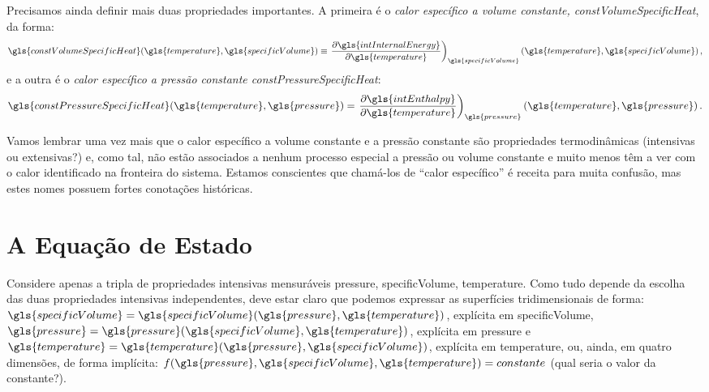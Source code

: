     Precisamos ainda definir mais duas propriedades importantes. A primeira é o
    \emph{calor específico a volume constante, \gls{constVolumeSpecificHeat}},
    da forma:
    \begin{equation} \label{eq:5.21}
        \gls{constVolumeSpecificHeat}
        \functionOf{
            \gls{temperature},
            \gls{specificVolume}
        }
        \equiv
        \ddxconsty{
            \gls{intInternalEnergy}
        }{
            \gls{temperature}
        }{
            \gls{specificVolume}
        }
        \functionOf{
            \gls{temperature},
            \gls{specificVolume}
        }\,,
    \end{equation}
    e a outra é o \emph{calor específico a pressão constante
    \gls{constPressureSpecificHeat}}:
    \begin{equation} \label{eq:5.22}
        \gls{constPressureSpecificHeat}
        \functionOf{
            \gls{temperature},
            \gls{pressure}
        }
        =
        \ddxconsty{
            \gls{intEnthalpy}
        }{
            \gls{temperature}
        }{
            \gls{pressure}
        }
        \functionOf{
            \gls{temperature},
            \gls{pressure}
        }\,.
    \end{equation}

    Vamos lembrar uma vez mais que o calor específico a volume constante e a
    pressão constante são propriedades termodinâmicas (intensivas ou
    extensivas?) e, como tal, não estão associados a nenhum processo especial a
    pressão ou volume constante e muito menos têm a ver com o calor
    identificado na fronteira do sistema. Estamos conscientes que chamá-los de
    \enquote{calor específico} é receita para muita confusão, mas estes nomes
    possuem fortes conotações históricas.


    \section{A Equação de Estado}

    Considere apenas a tripla de propriedades intensivas mensuráveis
    \gls{pressure}, \gls{specificVolume}, \gls{temperature}.  Como tudo depende
    da escolha das duas propriedades intensivas independentes, deve estar claro
    que podemos expressar as superfícies tridimensionais de forma:
    $\gls{specificVolume} = \gls{specificVolume}\functionOf{\gls{pressure},
    \gls{temperature}}$, explícita em \gls{specificVolume}, $\gls{pressure} =
    \gls{pressure}\functionOf{\gls{specificVolume}, \gls{temperature}}$,
    explícita em \gls{pressure} e $\gls{temperature} =
    \gls{temperature}\functionOf{\gls{pressure}, \gls{specificVolume}}$,
    explícita em \gls{temperature}, ou, ainda, em quatro dimensões, de forma
    implícita: $f\functionOf{\gls{pressure}, \gls{specificVolume},
    \gls{temperature}} = constante$ (qual seria o valor da constante?).

